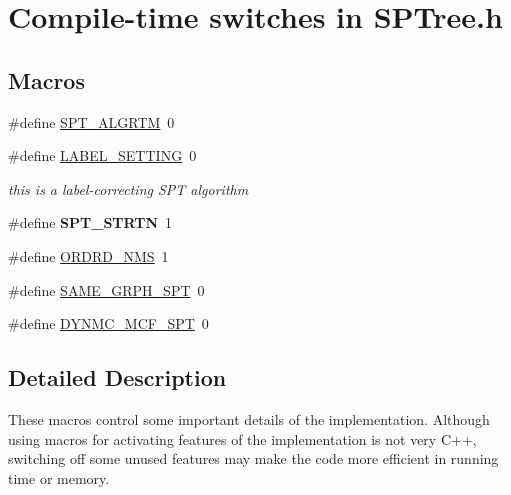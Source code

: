 \hypertarget{group___s_p_t_r_e_e___m_a_c_r_o_s}{}\section{Compile-\/time switches in S\+P\+Tree.\+h}
\label{group___s_p_t_r_e_e___m_a_c_r_o_s}
\subsection*{Macros}
\begin{DoxyCompactItemize}
\item 
\#define \mbox{\hyperlink{group___s_p_t_r_e_e___m_a_c_r_o_s_gace32589e54f63e7934ba934f5893af4b}{S\+P\+T\+\_\+\+A\+L\+G\+R\+TM}}~0
\item 
\mbox{\label{group___s_p_t_r_e_e___m_a_c_r_o_s_ga0f6afc876d9202c73d9d7a4ac37db521}} 
\#define \mbox{\hyperlink{group___s_p_t_r_e_e___m_a_c_r_o_s_ga0f6afc876d9202c73d9d7a4ac37db521}{L\+A\+B\+E\+L\+\_\+\+S\+E\+T\+T\+I\+NG}}~0
\begin{DoxyCompactList}\small\item\em this is a label-\/correcting S\+PT algorithm \end{DoxyCompactList}\item 
\mbox{\label{group___s_p_t_r_e_e___m_a_c_r_o_s_ga54593fde27c217c37d3f66200a21024d}} 
\#define {\bfseries S\+P\+T\+\_\+\+S\+T\+R\+TN}~1
\item 
\#define \mbox{\hyperlink{group___s_p_t_r_e_e___m_a_c_r_o_s_ga51ea746230b8df61d22a28b55c30527e}{O\+R\+D\+R\+D\+\_\+\+N\+MS}}~1
\item 
\#define \mbox{\hyperlink{group___s_p_t_r_e_e___m_a_c_r_o_s_gac2e46738206e9f275b6249a6ef284595}{S\+A\+M\+E\+\_\+\+G\+R\+P\+H\+\_\+\+S\+PT}}~0
\item 
\#define \mbox{\hyperlink{group___s_p_t_r_e_e___m_a_c_r_o_s_gad5743edcdb08edda28cc06bd329d6f03}{D\+Y\+N\+M\+C\+\_\+\+M\+C\+F\+\_\+\+S\+PT}}~0
\end{DoxyCompactItemize}


\subsection{Detailed Description}
These macros control some important details of the implementation. Although using macros for activating features of the implementation is not very C++, switching off some unused features may make the code more efficient in running time or memory. 

